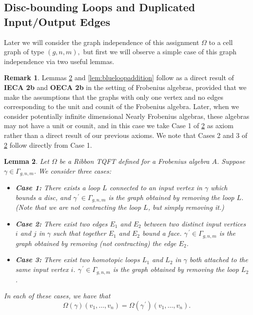\documentclass{amsart}
\newcommand{\be}{\begin{equation}}
\newcommand{\ee}{\end{equation}}
\newcommand{\pri}{^{\,\prime}}
\newtheorem{Lem}{Lemma}[section]
\theoremstyle{definition}
\newtheorem{Rmk}[Lem]{Remark}
\begin{document}
\subsection{Disc-bounding Loops and Duplicated Input/Output Edges}
Later we will consider the graph independence of this assignment $\Omega$ to a cell graph of type $(g,n,m),$ but first we will observe a simple case of this graph independence via two useful lemmas. 

\begin{Rmk}\label{rmk:loopremoval}
	Lemmas \ref{lem:redloopremoval} and \ref{lem:blueloopaddition} follow as a direct result of \textbf{IECA 2b} and \textbf{OECA 2b} in the setting of Frobenius algebras, provided that we make the assumptions that the graphs with only one vertex and no edges corresponding to the unit and counit of the Frobenius algebra. Later, when we consider potentially infinite dimensional Nearly Frobenius algebras, these algebras may not have a unit or counit, and in this case we take Case 1 of \ref{lem:redloopremoval} as axiom rather than a direct result of our previous axioms. We note that Cases 2 and 3 of \ref{lem:redloopremoval} follow directly from Case 1.
\end{Rmk}
\begin{Lem}\label{lem:redloopremoval}
    Let $\Omega$ be a Ribbon TQFT defined for a Frobenius algebra $A$. Suppose $\gamma\in\Gamma_{g,n,m}$. We consider three cases:
    \begin{itemize}
        \item \textbf{Case 1:} There exists a loop $L$ connected to an input vertex in $\gamma$ which bounds a disc, and $\gamma\pri\in\Gamma_{g,n,m}$ is the graph obtained by removing the loop $L$. \\(Note that we are not contracting the loop $L$, but simply removing it.)
        \item \textbf{Case 2:} There exist two edges $E_1$ and $E_2$ between two distinct input vertices $i$ and $j$ in $\gamma$ such that together $E_1$ and $E_2$ bound a face. $\gamma\pri\in\Gamma_{g,n,m}$ is the graph obtained by removing (not contracting) the edge $E_2$.
        \item \textbf{Case 3:} There exist two homotopic loops $L_1$ and $L_2$ in $\gamma$ both attached to the same input vertex $i$. $\gamma\pri\in\Gamma_{g,n,m}$ is the graph obtained by removing the loop $L_2$.
    \end{itemize}
    In each of these cases, we have that 
    \be\label{eqn:reddisc}
    \Omega(\gamma)(v_1,\ldots,v_n)=\Omega(\gamma\pri)(v_1,\ldots,v_n).
    \ee
\end{Lem}
\end{document}

